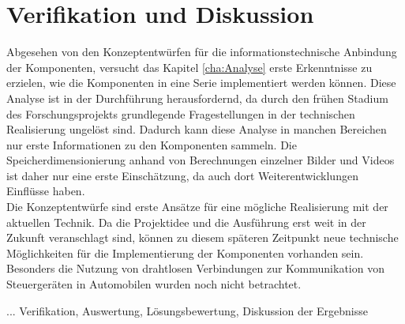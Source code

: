 \chapter{Verifikation und Diskussion}
\label{cha:Verifikation}
Abgesehen von den Konzeptentwürfen für die informationstechnische Anbindung der Komponenten, versucht das Kapitel \ref{cha:Analyse} erste Erkenntnisse zu erzielen, wie die Komponenten in eine Serie implementiert werden können. Diese Analyse ist in der Durchführung herausfordernd, da durch den frühen Stadium des Forschungsprojekts grundlegende Fragestellungen in der technischen Realisierung ungelöst sind. Dadurch kann diese Analyse in manchen Bereichen nur erste Informationen zu den Komponenten sammeln. Die Speicherdimensionierung anhand von Berechnungen einzelner Bilder und Videos ist daher nur eine erste Einschätzung, da auch dort Weiterentwicklungen Einflüsse haben.\\
Die Konzeptentwürfe sind erste Ansätze für eine mögliche Realisierung mit der aktuellen Technik. Da die Projektidee und die Ausführung erst weit in der Zukunft veranschlagt sind, können zu diesem späteren Zeitpunkt neue technische Möglichkeiten für die Implementierung der Komponenten vorhanden sein. Besonders die Nutzung von drahtlosen Verbindungen zur Kommunikation von Steuergeräten in Automobilen wurden noch nicht betrachtet. 

... Verifikation, Auswertung, Lösungsbewertung, Diskussion der Ergebnisse
